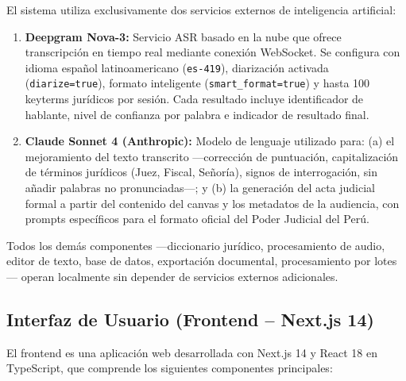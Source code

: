 \documentclass[12pt,a4paper,oneside]{report}
\begin{document}
El sistema utiliza exclusivamente dos servicios externos de inteligencia artificial:

\begin{enumerate}
\item \textbf{Deepgram Nova-3:} Servicio ASR basado en la nube que ofrece transcripción en tiempo real mediante conexión WebSocket. Se configura con idioma español latinoamericano (\texttt{es-419}), diarización activada (\texttt{diarize=true}), formato inteligente (\texttt{smart\_format=true}) y hasta 100 keyterms jurídicos por sesión. Cada resultado incluye identificador de hablante, nivel de confianza por palabra e indicador de resultado final.

\item \textbf{Claude Sonnet 4 (Anthropic):} Modelo de lenguaje utilizado para: (a) el mejoramiento del texto transcrito ---corrección de puntuación, capitalización de términos jurídicos (Juez, Fiscal, Señoría), signos de interrogación, sin añadir palabras no pronunciadas---; y (b) la generación del acta judicial formal a partir del contenido del canvas y los metadatos de la audiencia, con prompts específicos para el formato oficial del Poder Judicial del Perú.
\end{enumerate}

Todos los demás componentes ---diccionario jurídico, procesamiento de audio, editor de texto, base de datos, exportación documental, procesamiento por lotes--- operan localmente sin depender de servicios externos adicionales.

\subsection{Interfaz de Usuario (Frontend -- Next.js 14)}

El frontend es una aplicación web desarrollada con Next.js 14 y React 18 en TypeScript, que comprende los siguientes componentes principales:
\end{document}

